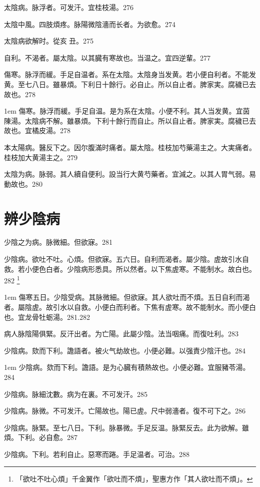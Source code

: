 太陰病。脉浮者。可发汗。宜桂枝湯。276

太陰中風。四肢煩疼。{\khaaitp 脉}陽微陰濇而长者。为欲愈。274

太陰病欲解时。從亥{\sungtpii 𥁞}丑。275

自利。不渴者。屬太陰。以其臓有寒故也。当温之。宜四逆輩。277

傷寒。脉浮而緩。手足自温者。系在太陰。太陰{\khaaitp 身}当发黄。若小便自利者。不能发黄。至七八日。雖暴煩。下利日十餘行。必自止。所以自止者。脾家実。腐穢已去故也。278

\hangindent 1em
傷寒。脉浮而緩。手足自温。是为系在太陰。小便不利。其人当发黄。宜茵陳湯。太陰病不解。雖暴煩。下利十餘行而自止。所以自止者。脾家実。腐穢已去故也。宜橘皮湯。278{\gaoben}

{\khaaitp 本}太陽病。醫反下之。因尔腹滿时痛者。屬太陰。桂枝加芍藥湯主之。大実痛者。桂枝加大黄湯主之。279

太陰为病。脉弱。其人續自便利。設当行大黄芍藥者。宜減之。以其人胃气弱。易動故也。280

\chapter{辨少陰病}

少陰之为病。脉微細。但欲寐。281

少陰病。欲吐不吐。心煩。但欲寐。五六日。自利而渴者。屬少陰。虗故引水自救。若小便色白者。少陰病形悉具。所以然者。以下焦虗寒。不能制水。故白也。282
	\footnote{「欲吐不吐心煩」千金翼作「欲吐而不煩」，聖惠方作「其人欲吐而不煩」。}

\hangindent 1em
傷寒五日。少陰受病。其脉微細。但欲寐。其人欲吐而不煩。五日自利而渴者。屬陰虗。故引水以自救。小便白而利者。下焦有虗寒。故不能制水。而小便白也。宜龙骨牡蛎湯。{\gaoben}281.282

病人脉陰陽俱緊。反汗出者。为亡陽。此屬少陰。法当咽痛。而復吐利。283

少陰病。欬而下利。譫語者。被火气劫故也。小便必難。以强責少陰汗也。284

\hangindent 1em
少陰病。欬而下利。譫語。是为心臓有積熱故也。小便必難。宜服豬苓湯。{\gaoben}284

少陰病。脉細沈數。病为在裏。不可发汗。285

少陰病。脉微。不可发汗。亡陽故也。陽已虗。尺中弱濇者。復不可下之。286

少陰病。脉緊。至七八日。下利。脉暴微。手足反温。脉緊反去。此为欲解。雖煩。下利。必自愈。287

少陰病。下利。若利自止。惡寒而踡。手足温者。可治。288

